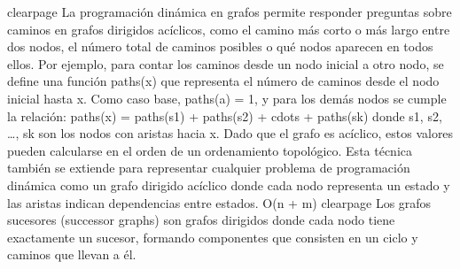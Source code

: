 {}\markdownRendererInterblockSeparator
{}\markdownRendererDollarSign{}\markdownRendererBackslash{}clearpage\markdownRendererDollarSign{}\markdownRendererInterblockSeparator
{}
\markdownRendererSectionEnd 
\markdownRendererSectionEnd \markdownRendererSectionBegin
{}\markdownRendererInterblockSeparator
{}La programación dinámica en grafos permite responder preguntas sobre caminos en grafos dirigidos acíclicos, como el camino más corto o más largo entre dos nodos, el número total de caminos posibles o qué nodos aparecen en todos ellos.\markdownRendererParagraphSeparator
{}Por ejemplo, para contar los caminos desde un nodo inicial a otro nodo, se define una función paths(x) que representa el número de caminos desde el nodo inicial hasta x.\markdownRendererParagraphSeparator
{}Como caso base, paths(a) = 1, y para los demás nodos se cumple la relación:\markdownRendererHardLineBreak
{}\markdownRendererDollarSign{}\markdownRendererDollarSign{}paths(x) = paths(s\markdownRendererUnderscore{}1) + paths(s\markdownRendererUnderscore{}2) + \markdownRendererBackslash{}cdots + paths(s\markdownRendererUnderscore{}k)\markdownRendererDollarSign{}\markdownRendererDollarSign{}\markdownRendererHardLineBreak
{}donde \markdownRendererDollarSign{}s\markdownRendererUnderscore{}1, s\markdownRendererUnderscore{}2, …, s\markdownRendererUnderscore{}k\markdownRendererDollarSign{} son los nodos con aristas hacia x.\markdownRendererParagraphSeparator
{}Dado que el grafo es acíclico, estos valores pueden calcularse en el orden de un ordenamiento topológico.\markdownRendererHardLineBreak
{}Esta técnica también se extiende para representar cualquier problema de programación dinámica como un grafo dirigido acíclico donde cada nodo representa un estado y las aristas indican dependencias entre estados.\markdownRendererHardLineBreak
{}\markdownRendererDollarSign{}\markdownRendererDollarSign{}O(n + m)\markdownRendererDollarSign{}\markdownRendererDollarSign{}\markdownRendererParagraphSeparator
{}\markdownRendererInterblockSeparator
{}\markdownRendererDollarSign{}\markdownRendererBackslash{}clearpage\markdownRendererDollarSign{}\markdownRendererInterblockSeparator
{}
\markdownRendererSectionEnd \markdownRendererSectionBegin
{}\markdownRendererInterblockSeparator
{}Los grafos sucesores (successor graphs) son grafos dirigidos donde cada nodo tiene exactamente un sucesor, formando componentes que consisten en un ciclo y caminos que llevan a él.\markdownRendererParagraphSeparator

